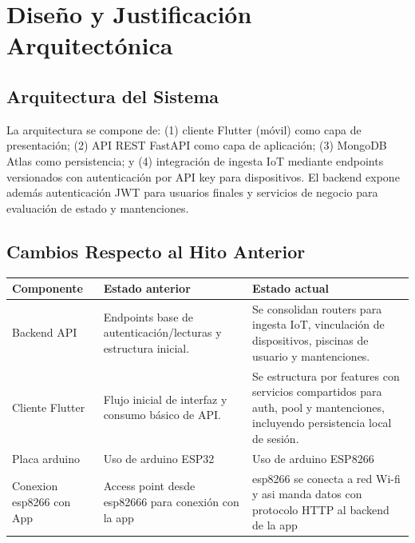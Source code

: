 \documentclass[11pt, a4paper]{article}
\begin{document}
\section{Diseño y Justificación Arquitectónica}

\subsection{Arquitectura del Sistema}


La arquitectura se compone de: (1) cliente Flutter (móvil) como capa de presentación; (2) API REST FastAPI como capa de aplicación; (3) MongoDB Atlas como persistencia; y (4) integración de ingesta IoT mediante endpoints versionados con autenticación por API key para dispositivos. El backend expone además autenticación JWT para usuarios finales y servicios de negocio para evaluación de estado y mantenciones.

\subsection{Cambios Respecto al Hito Anterior}

\begin{tabularx}{\textwidth}{@{} l X X @{}}
  \toprule
  \textbf{Componente} & \textbf{Estado anterior} & \textbf{Estado actual} \\
  \midrule
  Backend API & Endpoints base de autenticación/lecturas y estructura inicial. & Se consolidan routers para ingesta IoT, vinculación de dispositivos, piscinas de usuario y mantenciones. \\
  Cliente Flutter & Flujo inicial de interfaz y consumo básico de API. & Se estructura por features con servicios compartidos para auth, pool y mantenciones, incluyendo persistencia local de sesión. \\
  Placa arduino & Uso de arduino ESP32 & Uso de arduino ESP8266 \\
  Conexion esp8266 con App & Access point desde esp82666 para conexión con la app & esp8266 se conecta a red Wi-fi y asi manda datos con protocolo HTTP al backend de la app \\
  \bottomrule
\end{tabularx}
\end{document}
